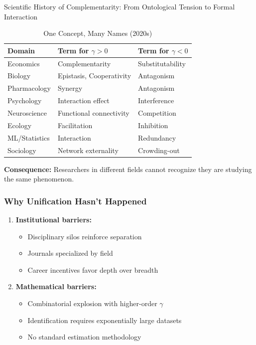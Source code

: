 \begin{chapter}{Scientific History of Complementarity: From Ontological Tension to Formal Interaction}
\begin{table}[h]
\centering
\caption{One Concept, Many Names (2020s)}
\label{tab:vocabulary-babel}
\renewcommand{\arraystretch}{1.2}
\small
\begin{tabular}{@{}lll@{}}
\toprule
\textbf{Domain} & \textbf{Term for $\gamma > 0$} & \textbf{Term for $\gamma < 0$} \\
\midrule
Economics & Complementarity & Substitutability \\
Biology & Epistasis, Cooperativity & Antagonism \\
Pharmacology & Synergy & Antagonism \\
Psychology & Interaction effect & Interference \\
Neuroscience & Functional connectivity & Competition \\
Ecology & Facilitation & Inhibition \\
ML/Statistics & Interaction & Redundancy \\
Sociology & Network externality & Crowding-out \\
\bottomrule
\end{tabular}
\end{table}

\textbf{Consequence:} Researchers in different fields cannot recognize they are studying the same phenomenon.

\subsubsection{Why Unification Hasn't Happened}

\begin{enumerate}
    \item \textbf{Institutional barriers:}
    \begin{itemize}[noitemsep]
        \item Disciplinary silos reinforce separation
        \item Journals specialized by field
        \item Career incentives favor depth over breadth
    \end{itemize}

    \item \textbf{Mathematical barriers:}
    \begin{itemize}[noitemsep]
        \item Combinatorial explosion with higher-order $\gamma$
        \item Identification requires exponentially large datasets
        \item No standard estimation methodology
    \end{itemize}


\end{enumerate}
\end{chapter}
